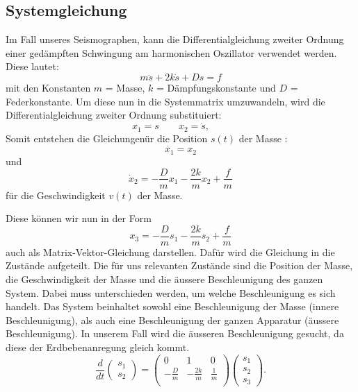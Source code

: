 \subsection{Systemgleichung}
Im Fall unseres Seismographen, kann die Differentialgleichung zweiter Ordnung einer gedämpften Schwingung am harmonischen Oszillator verwendet werden. 
Diese lautet:
\begin{equation}
m\ddot s + 2k \dot s + Ds = f
\end{equation}
mit den Konstanten $m$ = Masse, $k$ = Dämpfungskonstante und $D$  = Federkonstante.
Um diese nun in die Systemmatrix umzuwandeln, wird die Differentialgleichung zweiter Ordnung substituiert:
\[ {x_1}=s \qquad
{x_2}=\dot s,  \qquad\]
Somit entstehen die Gleichungenür die Position $s(t)$ der Masse :
\[ \dot {x_1} = {x_2}\] 
und
\[ \dot x_2 = -\frac{D}{m} {x_1} -\frac{2k}{m} {x_2} + \frac{f} {m} \] für die Geschwindigkeit $v(t)$ der Masse.

Diese können wir nun in der Form
\[ {x_3}=-\frac{D}{m} {s_1} -\frac{2k}{m} {s_2} + \frac{f} {m} \]
auch als Matrix-Vektor-Gleichung darstellen.
Dafür wird die Gleichung in die Zustände aufgeteilt. 
Die für uns relevanten Zustände sind die Position der Masse, die Geschwindigkeit der Masse und die äussere Beschleunigung des ganzen System. 
Dabei muss unterschieden werden, um welche Beschleunigung es sich handelt. 
Das System beinhaltet sowohl eine Beschleunigung der Masse (innere Beschleunigung), als auch eine Beschleunigung der ganzen Apparatur (äussere Beschleunigung). 
In unserem Fall wird die äusseren Beschleunigung gesucht, da diese der Erdbebenanregung gleich kommt. 
\begin{equation}
\frac{d}{dt} \left(\begin{array}{c} {s_1} \\ {s_2}  \end{array}\right) = \left(
 \begin{array}{ccc} 	
0 & 1& 0 \\ 
- \frac{D}{m} &-\frac{2k}{m} & \frac{1} {m}\\
\end{array}\right)  \left(\begin{array}{c} {s_1} \\ {s_2} \\ {s_3} \end{array}\right).
\end{equation}

